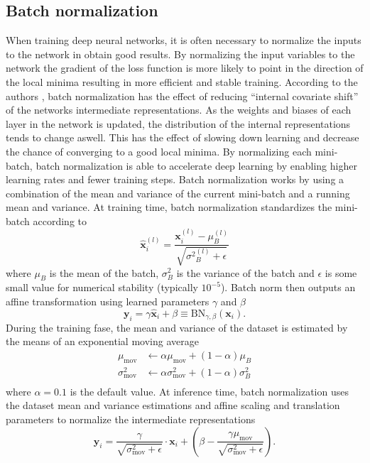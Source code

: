 \documentclass[a4paper,11pt]{article} %
\begin{document}
\subsection{Batch normalization}
When training deep neural networks, it is often necessary to normalize the inputs to the network in obtain good results. By normalizing the input variables to the network the gradient of the loss function is more likely to point in the direction of the local minima resulting in more efficient and stable training. According to the authors \cite{ioffe2015batch}, batch normalization has the effect of reducing ``internal covariate shift'' of the networks intermediate representations. As the weights and biases of each layer in the network is updated, the distribution of the internal representations tends to change aswell. This has the effect of slowing down learning and decrease the chance of converging to a good local minima. By normalizing each mini-batch, batch normalization is able to accelerate deep learning by enabling higher learning rates and fewer training steps. Batch normalization works by using a combination of the mean and variance of the current mini-batch and a running mean and variance. At training time, batch normalization standardizes the mini-batch according to
\begin{equation}
  \hat{\mathbf{x}}_{i}^{(l)} = \frac{\mathbf{x}^{(l)}_{i}-\mu^{(l)}_{B}}{\sqrt{{\sigma^{2}}^{(l)}_{B}+\epsilon}}
\end{equation}
where $\mu_{B}$ is the mean of the batch, $\sigma_{B}^{2}$ is the variance of the batch and $\epsilon$ is some small value for numerical stability (typically $10^{-5}$). Batch norm then outputs an affine transformation using learned parameters $\gamma$ and $\beta$
\begin{equation}
  \mathbf{y}_{i} = \gamma \hat{\mathbf{x}}_{i}+\beta \equiv \mathrm{BN}_{\gamma, \beta}\left(\mathbf{x}_{i}\right).
\end{equation}
During the training fase, the mean and variance of the dataset is estimated by the means of an exponential moving average
\begin{equation}
  \begin{split}
    \mu_\text{mov} &\leftarrow \alpha \mu_\text{mov} + (1 - \alpha)\mu_{B} \\
    \sigma^2_\text{mov} &\leftarrow \alpha \sigma^2_\text{mov} + (1 - \alpha)\sigma^2_{B} \\
  \end{split}
\end{equation}
where $\alpha=0.1$ is the default value. At inference time, batch normalization uses the dataset mean and variance estimations and affine scaling and translation parameters to normalize the intermediate representations
\begin{equation} \label{eq:batch-norm}
  \mathbf{y}_i = \frac{\gamma}{\sqrt{\sigma^{2}_\text{mov} +\epsilon}} \cdot \mathbf{x}_i +\left(\beta - \frac{\gamma \mu_\text{mov}}{\sqrt{\sigma^{2}_\text{mov}+\epsilon}}\right).
\end{equation}
\end{document}
